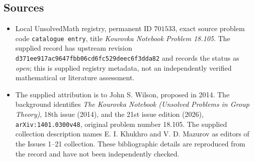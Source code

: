 \documentclass[11pt]{article}
\begin{document}
\subsection{Sources}
\begin{itemize}
\item Local UnsolvedMath registry, permanent ID \(701533\), exact source problem code \texttt{catalogue entry}, title \emph{Kourovka Notebook Problem 18.105}. The supplied record has upstream revision \texttt{d371ee917ac9647fbb06cd6fc529deec6f3dda82} and records the status as \emph{open}; this is supplied registry metadata, not an independently verified mathematical or literature assessment.
\item The supplied attribution is to John S. Wilson, proposed in 2014. The background identifies \emph{The Kourovka Notebook (Unsolved Problems in Group Theory)}, 18th issue (2014), and the 21st issue edition (2026), \texttt{arXiv:1401.0300v48}, original problem number 18.105. The supplied collection description names E. I. Khukhro and V. D. Mazurov as editors of the Issues 1--21 collection. These bibliographic details are reproduced from the record and have not been independently checked.
\end{itemize}
\end{document}
